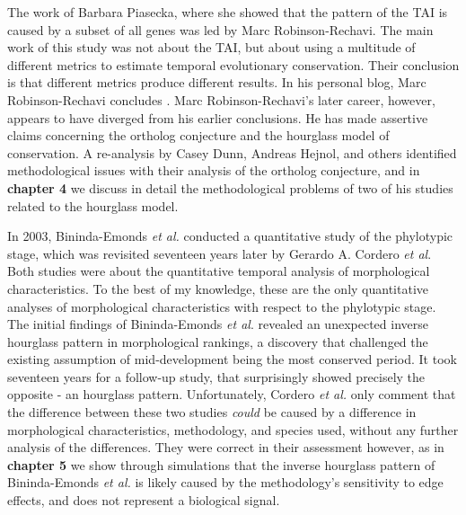 The work of Barbara Piasecka, where she showed that the pattern of the TAI is caused by a subset of all genes was led by Marc Robinson-Rechavi. The main work of this study was not about the TAI, but about using a multitude of different metrics to estimate temporal evolutionary conservation. Their conclusion is that different metrics produce different results. In his personal blog, Marc Robinson-Rechavi concludes \cite{robinsonrechaviblog}. Marc Robinson-Rechavi's later career, however, appears to have diverged from his earlier conclusions. He has made assertive claims concerning the ortholog conjecture\cite{KryuchkovaMostacci2016} and the hourglass model of conservation\cite{Liu2020,Liu2021,marletaz2018}. A re-analysis by Casey Dunn, Andreas Hejnol, and others identified methodological issues with their analysis of the ortholog conjecture\cite{Dunn2018}, and in \textbf{chapter 4} we discuss in detail the methodological problems of two of his studies related to the hourglass model.

In 2003, Bininda-Emonds \textit{et al.} conducted a quantitative study of the phylotypic stage, which was revisited seventeen years later by Gerardo A. Cordero \textit{et al}\cite{OlafRP2003, Cordero2020}. Both studies were about the quantitative temporal analysis of morphological characteristics. To the best of my knowledge, these are the only quantitative analyses of morphological characteristics with respect to the phylotypic stage. The initial findings of Bininda-Emonds \textit{et al}. revealed an unexpected inverse hourglass pattern in morphological rankings, a discovery that challenged the existing assumption of mid-development being the most conserved period. It took seventeen years for a follow-up study, that surprisingly showed precisely the opposite - an hourglass pattern. Unfortunately, Cordero \textit{et al.} only comment that the difference between these two studies \textit{could} be caused by a difference in morphological characteristics, methodology, and species used, without any further analysis of the differences. They were correct in their assessment however, as in \textbf{chapter 5} we show through simulations that the inverse hourglass pattern of Bininda-Emonds \textit{et al.} is likely caused by the methodology's sensitivity to edge effects, and does not represent a biological signal.

